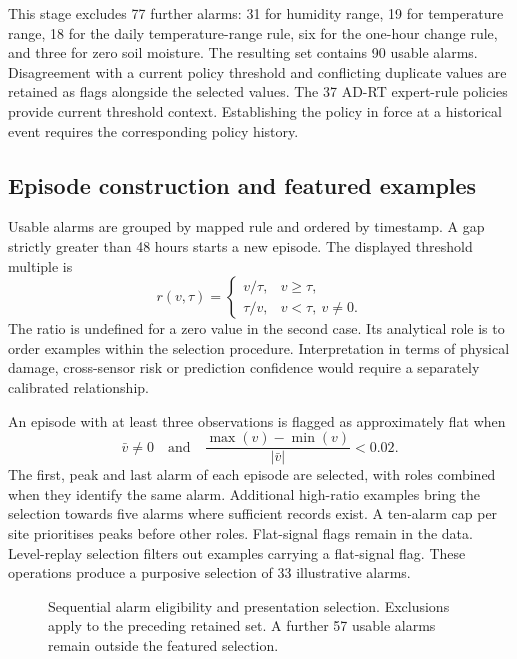 \documentclass[10pt,a4paper]{article}
\begin{document}
This stage excludes 77 further alarms: 31 for humidity range, 19 for temperature range, 18 for the daily temperature-range rule, six for the one-hour change rule, and three for zero soil moisture. The resulting set contains 90 usable alarms. Disagreement with a current policy threshold and conflicting duplicate values are retained as flags alongside the selected values. The 37 AD-RT expert-rule policies provide current threshold context. Establishing the policy in force at a historical event requires the corresponding policy history.

\subsection{Episode construction and featured examples}
Usable alarms are grouped by mapped rule and ordered by timestamp. A gap strictly greater than 48 hours starts a new episode. The displayed threshold multiple is
\begin{equation}
r(v,\tau)=
\begin{cases}
v/\tau,&v\geq\tau,\\
\tau/v,&v<\tau,\ v\neq0.
\end{cases}
\end{equation}
The ratio is undefined for a zero value in the second case. Its analytical role is to order examples within the selection procedure. Interpretation in terms of physical damage, cross-sensor risk or prediction confidence would require a separately calibrated relationship.

An episode with at least three observations is flagged as approximately flat when
\begin{equation}
\bar v\neq0
\quad\text{and}\quad
\frac{\max(v)-\min(v)}{|\bar v|}<0.02.
\end{equation}
The first, peak and last alarm of each episode are selected, with roles combined when they identify the same alarm. Additional high-ratio examples bring the selection towards five alarms where sufficient records exist. A ten-alarm cap per site prioritises peaks before other roles. Flat-signal flags remain in the data. Level-replay selection filters out examples carrying a flat-signal flag. These operations produce a purposive selection of 33 illustrative alarms.

\begin{figure}[htbp]
\centering
\caption{Sequential alarm eligibility and presentation selection. Exclusions apply to the preceding retained set. A further 57 usable alarms remain outside the featured selection.}\label{fig:funnel}
\end{figure}
\end{document}
